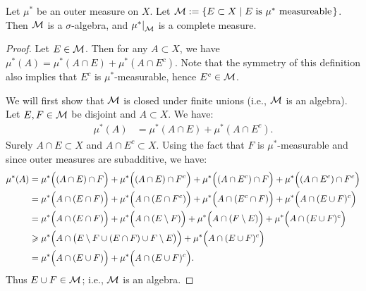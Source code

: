     \newpage
    \begin{lemma}\label{lemma:caratheodory}
        Let $\mu^\ast$ be an outer measure on $X$. Let $\cM := \{E \subset X \mid E \h3\text{is $\mu^\ast$ measureable}\h1\}$. Then $\cM$ is a $\sigma$-algebra, and $\restr{\mu^\ast}{\cM}$ is a complete measure.
    \end{lemma}
        \begin{proof}
            Let $E \in \cM$. Then for any $A \subset X$, we have $\mu^\ast(A) = \mu^\ast(A \cap E) + \mu^\ast(A \cap E^c)$. Note that the symmetry of this definition also implies that $E^c$ is $\mu^\ast$-measurable, hence $E^c \in \cM$.
            

            We will first show that $\cM$ is closed under finite unions (i.e., $\cM$ is an algebra). Let $E,F \in \cM$ be disjoint and $A \subset X$. We have:
                \begin{equation*}
                \begin{split}
                    \mu^\ast(A) 
                    & = \mu^\ast(A \cap E) + \mu^\ast(A \cap E^c).
                \end{split}
                \end{equation*}
            Surely $A \cap E \subset X$ and $A \cap E^c \subset X$. Using the fact that $F$ is $\mu^\ast$-measurable and since outer measures are subadditive, we have:
                \begin{equation*}
                \begin{split}
                    \mu^\ast(A)
                    & = \mu^\ast \Bigl((A \cap E) \cap F \Bigr) + \mu^\ast \Bigl((A \cap E) \cap F^c\Bigr) + \mu^\ast \Bigl((A \cap E^c) \cap F \Bigr) + \mu^\ast \Bigl((A \cap E^c) \cap F^c\Bigr) \\
                    & = \mu^\ast \Bigl(A \cap (E \cap F)\Bigr) + \mu^\ast \Bigl(A \cap (E \cap F^c)\Bigr) + \mu^\ast \Bigl(A \cap (E^c \cap F)\Bigr) + \mu^\ast \Bigl(A \cap (E \cup F)^c\Bigr) \\
                    & = \mu^\ast \Bigl(A \cap (E \cap F)\Bigr) + \mu^\ast \Bigl(A \cap (E \setminus F)\Bigr) + \mu^\ast \Bigl(A \cap (F \setminus E)\Bigr) + \mu^\ast \Bigl(A \cap (E \cup F)^c\Bigr) \\
                    & \geq \mu^\ast \Bigl( A \cap \bigl( E \setminus F \cup (E \cap F) \cup F \setminus E\bigr)\Bigr) + \mu^\ast \Bigl(A \cap (E \cup F)^c\Bigr) \\
                    & = \mu^\ast\Bigl(A \cap (E \cup F)\Bigr) + \mu^\ast\Bigl(A \cap (E \cup F)^c\Bigr).
                \end{split}
                \end{equation*}
            Thus $E \cup F \in \cM$; i.e., $\cM$ is an algebra.


\end{proof}
